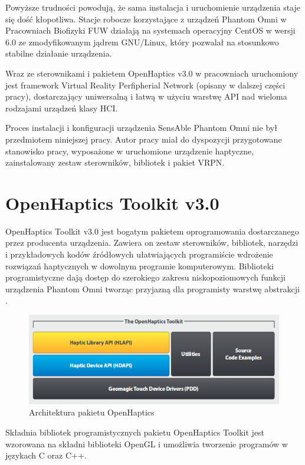 \documentclass[licencjacka]{pracamgr}
\begin{document}
Powyższe trudności powodują, że sama instalacja i uruchomienie urządzenia staje się dość kłopotliwa. Stacje robocze korzystające z urządzeń Phantom Omni w Pracowniach Biofizyki FUW działają na systemach operacyjny CentOS w wersji 6.0 ze zmodyfikowanym jądrem GNU/Linux, który pozwalał na stosunkowo stabilne działanie urządzenia. 

Wraz ze sterownikami i pakietem OpenHaptics v3.0 w pracowniach uruchomiony jest framework Virtual Reality Perfipherial Network (opisany w dalszej części pracy), dostarczający uniwersalną i łatwą w użyciu warstwę API nad wieloma rodzajami urządzeń klasy HCI. 

Proces instalacji i konfiguracji urządzenia SensAble Phantom Omni nie był przedmiotem niniejszej pracy. Autor pracy miał do dyspozycji przygotowane stanowisko pracy, wyposażone w uruchomione urządzenie haptyczne, zainstalowany zestaw sterowników, bibliotek i pakiet VRPN.

\section{OpenHaptics Toolkit v3.0}

OpenHaptics Toolkit v3.0 jest bogatym pakietem oprogramowania dostarczanego przez producenta urządzenia. Zawiera on zestaw sterowników, bibliotek, narzędzi i przykładowych kodów źródłowych ułatwiających programiście wdrożenie rozwiązań haptycznych w dowolnym programie komputerowym. Biblioteki programistyczne dają dostęp do szerokiego zakresu niskopoziomowych funkcji urządzenia Phantom Omni tworząc przyjazną dla programisty warstwę abstrakcji \cite{openHapticsBrochure}\cite{openHapticsProgrammersGuide}. 

\begin{figure}[H]
\centering
\includegraphics[scale=0.5,center]{openhaptics}
\caption{Architektura pakietu OpenHaptics}
\end{figure}

Składnia bibliotek programistycznych pakietu OpenHaptics Toolkit jest wzorowana na składni biblioteki OpenGL i umożliwia tworzenie programów w językach C oraz C++. 
\end{document}
